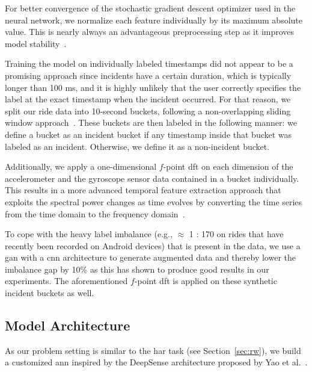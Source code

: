 For better convergence of the stochastic gradient descent optimizer used in the neural network, we normalize each feature individually by its maximum absolute value.
This is nearly always an advantageous preprocessing step as it improves model stability~\cite{bishop1995neural}.

Training the model on individually labeled timestamps did not appear to be a promising approach since incidents have a certain duration, which is typically longer than 100 ms, and it is highly unlikely that the user correctly specifies the label at the exact timestamp when the incident occurred.
For that reason, we split our ride data into 10-second buckets, following a non-overlapping sliding window approach~\cite{ortiz2011dynamic}.
These buckets are then labeled in the following manner: we define a bucket as an incident bucket if any timestamp inside that bucket was labeled as an incident.
Otherwise, we define it as a non-incident bucket.

Additionally, we apply a one-dimensional $f$-point \ac{dft} on each dimension of the accelerometer and the gyroscope sensor data contained in a bucket individually.
This results in a more advanced temporal feature extraction approach that exploits the spectral power changes as time evolves by converting the time series from the time domain to the frequency domain~\cite{chen2021deep}.


To cope with the heavy label imbalance (e.g., $\approx$ 1 : 170 on rides that have recently been recorded on Android devices) that is present in the data, we use a \ac{gan} with a \ac{cnn} architecture to generate augmented data and thereby lower the imbalance gap by 10\% as this has shown to produce good results in our experiments.
The aforementioned $f$-point \ac{dft} is applied on these synthetic incident buckets as well.

\subsection{Model Architecture}
\label{subsec:model_architecture}
As our problem setting is similar to the \ac{har} task (see Section~\ref{sec:rw}), we build a customized \ac{ann} inspired by the DeepSense architecture proposed by Yao et al.~\cite{yao2017deepsense}.

